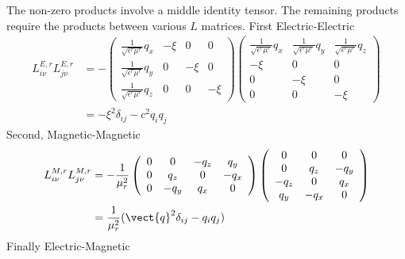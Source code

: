 The non-zero products involve a middle identity tensor.  The remaining products require 
the products between various $L$ matrices.
First Electric-Electric
\begin{align}
  L^{E,r}_{i\nu}L^{E,r}_{j\nu}&=
 -\left( \begin{array}{cccc} 
      \frac{1}{\sqrt{\epsilon^r\mu^r}}q_x & -\xi & 0 & 0\\
      \frac{1}{\sqrt{\epsilon^r\mu^r}}q_y & 0 &-\xi & 0\\
      \frac{1}{\sqrt{\epsilon^r\mu^r}}q_z & 0 & 0 & -\xi
    \end{array}
  \right)
\left( \begin{array}{ccc} 
      \frac{1}{\sqrt{\epsilon^r\mu^r}}q_x & \frac{1}{\sqrt{\epsilon^r\mu^r}}q_y & 
      \frac{1}{\sqrt{\epsilon^r\mu^r}}q_z\\
      -\xi &0 & 0\\
       0   &-\xi & 0\\
       0   & 0 & -\xi
    \end{array}
  \right)\\
&=-\xi^2\delta_{ij}-c^2q_iq_j
\end{align}
Second, Magnetic-Magnetic
\begin{align}
  L^{M,r}_{i\nu}L^{M,r}_{j\nu} &= -
   \frac{1}{\mu_r^2}\left( \begin{array}{cccc} 
      0 & 0 & -q_z & q_y\\
      0 & q_z & 0 & -q_x\\
      0 & -q_y & q_x & 0
    \end{array}
  \right)
\left( \begin{array}{cccc} 
      0 & 0 &  0\\
      0 & q_z & -q_y\\
      -q_z & 0 & q_x\\
      q_y & -q_x & 0
    \end{array}
  \right)\\
&=\frac{1}{\mu_r^2}(\vect{q}^2\delta_{ij}-q_iq_j)
\end{align}
Finally Electric-Magnetic
